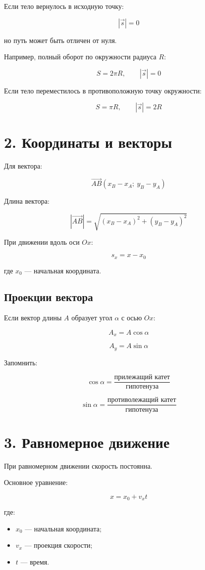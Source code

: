 \documentclass[a4paper,12pt]{article}
\begin{document}
Если тело вернулось в исходную точку:

\[
|\vec{s}|=0
\]

но путь может быть отличен от нуля.

Например, полный оборот по окружности радиуса $R$:

\[
S=2\pi R,\qquad |\vec{s}|=0
\]

Если тело переместилось в противоположную точку окружности:

\[
S=\pi R,\qquad |\vec{s}|=2R
\]

\section*{2. Координаты и векторы}

Для вектора:

\[
\vec{AB}(x_B-x_A;\ y_B-y_A)
\]

Длина вектора:

\[
|\vec{AB}|=
\sqrt{(x_B-x_A)^2+(y_B-y_A)^2}
\]

При движении вдоль оси $Ox$:

\[
s_x=x-x_0
\]

где $x_0$ --- начальная координата.

\subsection*{Проекции вектора}

Если вектор длины $A$ образует угол $\alpha$ с осью $Ox$:

\[
A_x=A\cos\alpha
\]

\[
A_y=A\sin\alpha
\]

Запомнить:

\[
\cos\alpha=
\frac{\text{прилежащий катет}}
{\text{гипотенуза}}
\]

\[
\sin\alpha=
\frac{\text{противолежащий катет}}
{\text{гипотенуза}}
\]

\section*{3. Равномерное движение}

При равномерном движении скорость постоянна.

Основное уравнение:

\[
x=x_0+v_xt
\]

где:

\begin{itemize}
\item $x_0$ --- начальная координата;
\item $v_x$ --- проекция скорости;
\item $t$ --- время.
\end{itemize}
\end{document}
